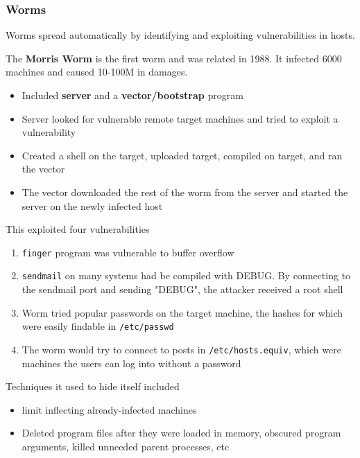 \documentclass[../notes.tex]{subfiles}
\begin{document}
\subsubsection{Worms}

Worms spread automatically by identifying and exploiting vulnerabilities in hosts.


\begin{example}
    The \textbf{Morris Worm} is the first worm and was related in 1988. It infected 6000 machines and caused 10-100M in damages. 
    

    \begin{itemize}
        \item Included \textbf{server} and a \textbf{vector/bootstrap} program
        \item Server looked for vulnerable remote target machines and tried to exploit a vulnerability
        \item Created a shell on the target, uploaded target, compiled on target, and ran the vector
        \item The vector downloaded the rest of the worm from the server and started the server on the newly infected host
    \end{itemize}

    This exploited four vulnerabilities

    \begin{enumerate}
        \item  \texttt{finger} program was vulnerable to buffer overflow
        \item \texttt{sendmail} on many systems had be compiled with DEBUG. By connecting to the sendmail port and sending "DEBUG", the attacker received a root shell
        \item Worm tried popular passwords on the target machine, the hashes for which were easily findable in \texttt{/etc/passwd}
        \item The worm would try to connect to posts in \texttt{/etc/hosts.equiv}, which were machines the users can log into without a password
    \end{enumerate}


    Techniques it used to hide itself included
    \begin{itemize}
        \item limit inflecting already-infected machines
        \item Deleted program files after they were loaded in memory, obscured program arguments, killed unneeded parent processes, etc
    \end{itemize}
\end{example}
\end{document}
